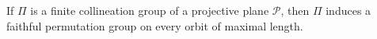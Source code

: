 If $\Pi$ is a finite collineation group of a projective plane $\mathcal{P}$, then $\Pi$ induces a faithful permutation group on every orbit of maximal length.

